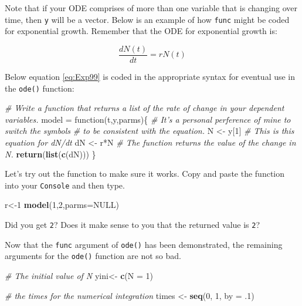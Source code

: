 \documentclass[]{book}
\newenvironment{Shaded}{\begin{snugshade}}{\end{snugshade}}
\newcommand{\KeywordTok}[1]{\textcolor[rgb]{0.13,0.29,0.53}{\textbf{{#1}}}}
\newcommand{\DataTypeTok}[1]{\textcolor[rgb]{0.13,0.29,0.53}{{#1}}}
\newcommand{\DecValTok}[1]{\textcolor[rgb]{0.00,0.00,0.81}{{#1}}}
\newcommand{\StringTok}[1]{\textcolor[rgb]{0.31,0.60,0.02}{{#1}}}
\newcommand{\CommentTok}[1]{\textcolor[rgb]{0.56,0.35,0.01}{\textit{{#1}}}}
\newcommand{\OtherTok}[1]{\textcolor[rgb]{0.56,0.35,0.01}{{#1}}}
\newcommand{\NormalTok}[1]{{#1}}
\begin{document}
Note that if your ODE comprises of more than one variable that is
changing over time, then \texttt{y} will be a vector. Below is an
example of how \texttt{func} might be coded for exponential growth.
Remember that the ODE for exponential growth is:

\begin{equation}
\frac{dN(t)}{dt} = rN(t) 
\label{eq:Exp99}
\end{equation}

Below equation \eqref{eq:Exp99} is coded in the appropriate syntax for
eventual use in the \texttt{ode()} function:

\begin{Shaded}
\begin{Highlighting}[]
\CommentTok{# Write a function that returns a list of the rate of change in your dependent variables.}
\NormalTok{model =}\StringTok{ }\NormalTok{function(t,y,parms)\{}
  \CommentTok{# It's a personal perference of mine to switch the symbols}
  \CommentTok{# to be consistent with the equation.}
  \NormalTok{N <-}\StringTok{ }\NormalTok{y[}\DecValTok{1}\NormalTok{]}
  \CommentTok{# This is this equation for dN/dt}
  \NormalTok{dN <-}\StringTok{ }\NormalTok{r*N}
  \CommentTok{# The function returns the value of the change in N.}
\KeywordTok{return}\NormalTok{(}\KeywordTok{list}\NormalTok{(}\KeywordTok{c}\NormalTok{(dN)))}
\NormalTok{\}}
\end{Highlighting}
\end{Shaded}

Let's try out the function to make sure it works. Copy and paste the
function into your \texttt{Console} and then type.

\begin{Shaded}
\begin{Highlighting}[]
\NormalTok{r<-}\DecValTok{1}
\KeywordTok{model}\NormalTok{(}\DecValTok{1}\NormalTok{,}\DecValTok{2}\NormalTok{,}\DataTypeTok{parms=}\OtherTok{NULL}\NormalTok{)}
\end{Highlighting}
\end{Shaded}

Did you get \texttt{2}? Does it make sense to you that the returned
value is \texttt{2}?

Now that the \texttt{func} argument of \texttt{ode()} has been
demonstrated, the remaining arguments for the \texttt{ode()} function
are not so bad.

\begin{Shaded}
\begin{Highlighting}[]
\CommentTok{# The initial value of N}
\NormalTok{yini<-}\StringTok{ }\KeywordTok{c}\NormalTok{(}\DataTypeTok{N =} \DecValTok{1}\NormalTok{)}

\CommentTok{# the times for the numerical integration}
\NormalTok{times <-}\StringTok{ }\KeywordTok{seq}\NormalTok{(}\DecValTok{0}\NormalTok{, }\DecValTok{1}\NormalTok{, }\DataTypeTok{by =} \NormalTok{.}\DecValTok{1}\NormalTok{)}
\end{Highlighting}
\end{Shaded}
\end{document}

